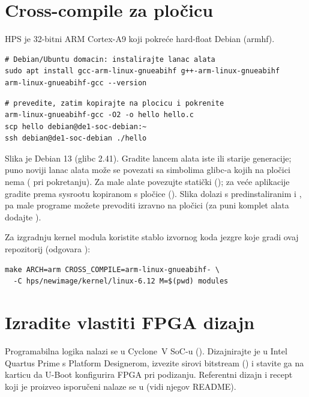 \section{Cross-compile za pločicu}
HPS je 32-bitni ARM Cortex-A9 koji pokreće hard-float Debian (armhf).
\begin{lstlisting}
# Debian/Ubuntu domacin: instalirajte lanac alata
sudo apt install gcc-arm-linux-gnueabihf g++-arm-linux-gnueabihf
arm-linux-gnueabihf-gcc --version
\end{lstlisting}
\begin{lstlisting}
# prevedite, zatim kopirajte na plocicu i pokrenite
arm-linux-gnueabihf-gcc -O2 -o hello hello.c
scp hello debian@de1-soc-debian:~
ssh debian@de1-soc-debian ./hello
\end{lstlisting}
\begin{note}
Slika je Debian 13 (glibc 2.41). Gradite lancem alata iste ili starije generacije;
puno noviji lanac alata može se povezati sa simbolima glibc-a kojih na pločici nema
( pri pokretanju). Za male alate povezujte
statički (); za veće aplikacije gradite prema sysrootu kopiranom s
pločice (). Slika dolazi s predinstaliranim  i
, pa male programe možete prevoditi izravno na pločici (za puni
komplet alata dodajte ).
\end{note}
Za izgradnju kernel modula koristite stablo izvornog koda jezgre koje gradi ovaj repozitorij
(odgovara ):
\begin{lstlisting}
make ARCH=arm CROSS_COMPILE=arm-linux-gnueabihf- \
  -C hps/newimage/kernel/linux-6.12 M=$(pwd) modules
\end{lstlisting}

\section{Izradite vlastiti FPGA dizajn}
Programabilna logika nalazi se u Cyclone~V SoC-u (). Dizajnirajte je u Intel Quartus
Prime s Platform Designerom, izvezite sirovi bitstream (\code{.rbf}) i stavite ga
na karticu da U-Boot konfigurira FPGA pri podizanju. Referentni dizajn i recept
koji je proizveo isporučeni \code{soc\_system.rbf} nalaze se u
 (vidi njegov README).

